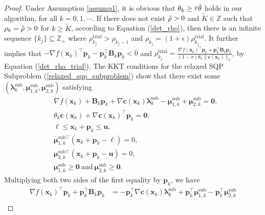 \documentclass[aos]{imsart}
\numberwithin{equation}{section}
\theoremstyle{plain}
\begin{document}
\begin{appendix}
 \begin{proof}
     Under Assumption \ref{assump1}, it is obvious that $\theta_k \geq \Tilde{\tau} \Tilde{\theta}$ holds in our algorithm, for all $k=0,1, \cdots$. If there does not exist $\Tilde{\rho}>0$ and $\widetilde{K} \in \mathbb{Z}$ such that $\rho_k = \Tilde{\rho} > 0$ for $k \geq \widetilde{K}$, according to Equation (\ref{det_rho}), then there is an infinite sequence $\{k_j\} \subseteq \mathbb{Z}_{+}$ where $\rho_{k_j}^{\text{trial}}  > \rho_{k_j-1}$ and $\rho_{k_j} = (1+\epsilon) \rho_{k_j}^{\text{trial}}$. It further implies that $-\nabla f(\bm{x}_k)^{\top} \bm{p}_k - \bm{p}_k^{\top} \bm{B}_k \bm{p}_k < 0$ and $\rho_{k_j}^{\text{trial}} = \frac{\nabla f(\bm{x}_k)^{\top} \bm{p}_k + \bm{p}_k^{\top} \bm{B}_k \bm{p}_k}{(1-\sigma)\theta_k \|\bm{c}(\bm{x}_k)\|_2}$, by Equation (\ref{det_rho_trial}). The KKT conditions for the relaxed SQP Subproblem (\ref{relaxed_sqp_subproblem}) show that
     there exist some $(\bm{\lambda}_k^{\text{sub}}, \bm{\mu}_{1,k}^{\text{sub}},\bm{\mu}_{2,k}^{\text{sub}})$ satisfying
     \begin{equation}
     \label{eq6}
         \begin{split}
             & \nabla f(\bm{x}_k) + \bm{B}_k \bm{p}_k + \nabla \bm{c}(\bm{x}_k) \bm{\lambda}_k^{\text{sub}} - \bm{\mu}_{1,k}^{\text{sub}} + \bm{\mu}_{2,k}^{\text{sub}} = \bm{0},\\
             & \theta_k \bm{c}(\bm{x}_{k})+ \nabla \bm{c}(\bm{x}_{k})^{\top}\bm{p}_k = \bm{0},\\
             & \bm{\ell} \leq \bm{x}_k + \bm{p}_k \leq \bm{u},\\
             & \bm{\mu}_{1,k}^{\text{sub} \top}(\bm{x}_k + \bm{p}_k - \bm{\ell}) = 0,\\
             & \bm{\mu}_{2,k}^{\text{sub} \top}(\bm{x}_k + \bm{p}_k - \bm{u}) = 0,\\
             & \bm{\mu}_{1,k}^{\text{sub}} \geq \bm{0}~\text{and}~ \bm{\mu}_{2,k}^{\text{sub}} \geq \bm{0}. 
         \end{split}
     \end{equation}
     Multiplying both two sides of the first equality by $\bm{p}_k$, we have
     \begin{equation*}
     \begin{split}
        \nabla f(\bm{x}_k)^{\top}\bm{p}_k + \bm{p}_k^{\top} \bm{B}_k \bm{p}_k & = -\bm{p}_k^{\top}\nabla \bm{c}(\bm{x}_k) \bm{\lambda}_k^{\text{sub}} + \bm{p}_k^{\top}\bm{\mu}_{1,k}^{\text{sub}} - \bm{p}_k^{\top}\bm{\mu}_{2,k}^{\text{sub}}\\

\end{split}
\end{equation*}
\end{proof}
\end{appendix}
\end{document}
